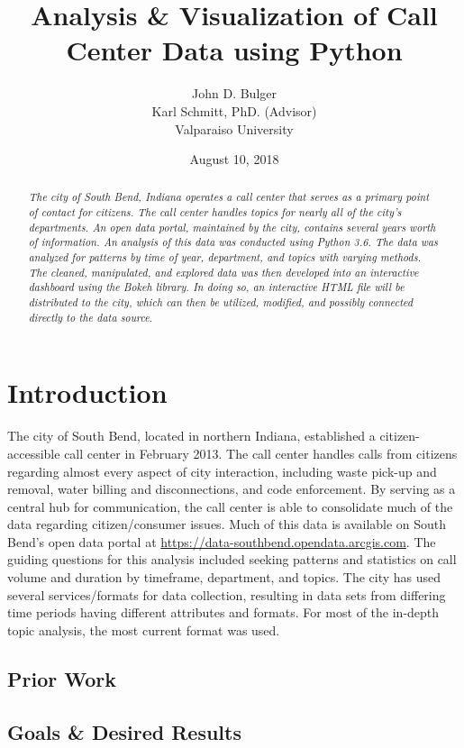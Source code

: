 \documentclass[11pt,twocolumn]{article}
\title{Analysis \& Visualization of Call Center Data using Python}
\author{John D. Bulger
\\
Karl Schmitt, PhD. (Advisor)
\\
Valparaiso University\\
}
\date{August 10, 2018}
\begin{document}
\maketitle

\begin{abstract}
\textit{The city of South Bend, Indiana operates a call center that serves as a primary point of contact for citizens.  The call center handles topics for nearly all of the city's departments.  An open data portal, maintained by the city, contains several years worth of information.  An analysis of this data was conducted using Python 3.6.  The data was 
analyzed for patterns by time of year, department, and topics with varying methods.  The cleaned, manipulated, and explored data was then developed into an 
interactive dashboard using the Bokeh library.  In doing so, an interactive HTML file will be distributed to the city, which can then be utilized, modified, and possibly connected 
directly to the data source}.
\end{abstract}

\section{Introduction}
The city of South Bend, located in northern Indiana, established a citizen-accessible call center in February 2013.  The call center handles calls from citizens regarding almost every aspect of city interaction, including waste pick-up and removal, water billing and disconnections, 
and code enforcement.  By serving as a central hub for communication, the call center is able to consolidate much of the data regarding citizen/consumer issues.  
Much of this data is available on South Bend's open data portal at \href{https://data-southbend.opendata.arcgis.com}{https://data-southbend.opendata.arcgis.com}.  The guiding questions for this analysis included seeking patterns and statistics on call volume and duration by timeframe, department, and topics.  The city has used several services/formats for data collection, resulting in data sets from differing time periods having different attributes and formats.  For most of the in-depth topic analysis, the most current format was used.

	\subsection{Prior Work}




	\subsection{Goals \& Desired Results}
\end{document}
